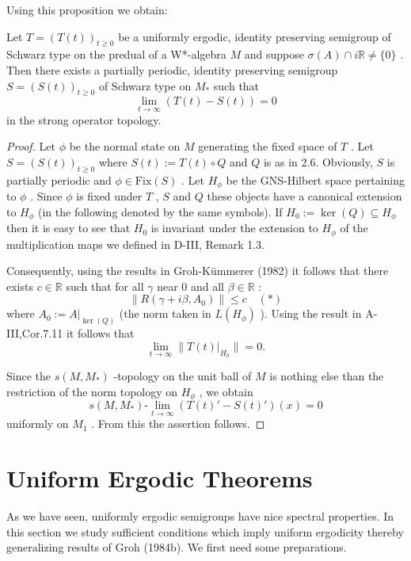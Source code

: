Using this proposition we obtain:

\begin{theorem}\label{thm:d4-3.11}
Let $ T = (T(t))_{t \geq 0} $  be a uniformly ergodic, identity preserving semigroup of Schwarz type on the predual of a W*-algebra $ M $  and suppose $ \sigma(A) \cap i\mathbb{R} \neq \{0\} $ .
Then there exists a partially periodic, identity preserving semigroup $ S = (S(t))_{t \geq 0} $  of Schwarz type on $ M_{*} $  such that
\[
\lim_{t \to \infty} (T(t) - S(t)) = 0
\]
in the strong operator topology.
\end{theorem}

\begin{proof}
Let $ \phi $  be the normal state on $ M $  generating the fixed space of $ T $ .
Let $ S = (S(t))_{t \geq 0} $  where $ S(t) := T(t) \circ Q $  and $ Q $  is as in 2.6.
Obviously, $ S $  is partially periodic and $ \phi \in \text{Fix}(S) $ .
Let $ H_{\phi} $  be the GNS-Hilbert space pertaining to $ \phi $ .
Since $ \phi $  is fixed under $ T $ , $ S $  and $ Q $  these objects have a canonical extension to $ H_{\phi} $  (in the following denoted by the same symbols).
If $ H_{0} := \ker(Q) \subseteq H_{\phi} $  then it is easy to see that $ H_{0} $  is invariant under the extension to $ H_{\phi} $  of the multiplication maps we defined in D-III, Remark 1.3.

Consequently, using the results in Groh-Kümmerer (1982) it follows that there exists $ c \in \mathbb{R} $  such that for all $ \gamma $  near $ 0 $  and all $ \beta \in \mathbb{R} $ :
\[
\|R(\gamma + i\beta,A_{0})\| \leq c \quad (*)
\]
where $ A_{0} := A|_{\ker(Q)} $  (the norm taken in $ L(H_{\phi}) $ ).
Using the result in A-III,Cor.7.11 it follows that
\[
\lim_{t \to \infty} \|T(t)|_{H_{0}}\| = 0.
\]

Since the $ s(M,M_{*}) $ -topology on the unit ball of $ M $  is nothing else than the restriction of the norm topology on $ H_{\phi} $ , we obtain
\[
s(M,M_{*})\text{-}\lim_{t \to \infty} (T(t)' - S(t)')(x) = 0
\]
uniformly on $ M_{1} $ .
From this the assertion follows.
\end{proof}

\newpage

\section{Uniform Ergodic Theorems}

As we have seen, uniformly ergodic semigroups have nice spectral properties.
In this section we study sufficient conditions which imply uniform ergodicity thereby generalizing results of Groh (1984b).
We first need some preparations.

